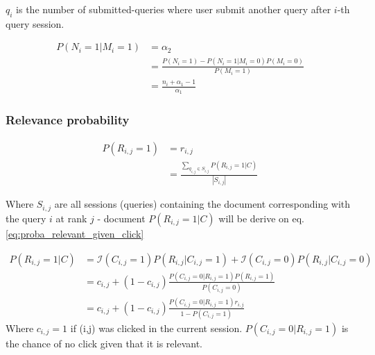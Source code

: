 $q_i$ is the number of submitted-queries where user submit another query after $i$-th query session.

\begin{align*}
	P(N_i=1|M_i=1) 
	&= \alpha_2 \\
	&= \frac{P(N_i=1) - P(N_i=1|M_i=0)P(M_i=0)}{P(M_i=1)} \\
	&= \frac{n_i + \alpha_1 - 1}{\alpha_1}
\end{align*}

\subsubsection{Relevance probability}
\begin{align*}
	P(R_{i,j} = 1)
	&= r_{i,j} \\
	&= \frac{\sum_{q_{i,j} \in S_{i,j}} P(R_{i,j}=1 | C)}{|S_{i,j}|}
\end{align*}

Where $S_{i,j}$ are all sessions (queries) containing the document corresponding with the query $i$ at rank $j$ - document
$P(R_{i,j}=1 | C)$ will be derive on eq.\ref{eq:proba_relevant_given_click}

\begin{align}
	P(R_{i,j}=1 | C)
	&= \mathcal{I}(C_{i,j} = 1) P(R_{i,j}|C_{i,j}=1) + \mathcal{I}(C_{i,j} = 0) P(R_{i,j}|C_{i,j}=0) \\
	&= c_{i,j} + (1-c_{i,j}) \frac {P(C_{i,j}=0|R_{i,j}=1) P(R_{i,j} = 1)} {P(C_{i,j} = 0)} \\
	&= c_{i,j} + (1-c_{i,j}) \frac {P(C_{i,j}=0|R_{i,j}=1) r_{i,j}} { 1 - P(C_{i,j} = 1)}
	\label{eq:proba_relevant_given_click}
\end{align}
Where $c_{i,j} = 1$ if (i,j) was clicked in the current session.
$P(C_{i,j}=0|R_{i,j}=1)$ is the chance of no click given that it is relevant. 

